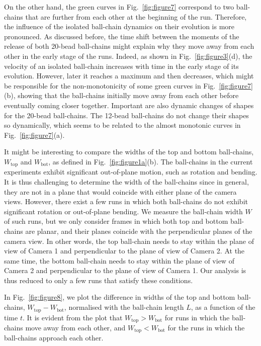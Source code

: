 \documentclass{article}
\begin{document}
On the other hand, the green curves in Fig.~\ref{fig:figure7} correspond to two ball-chains that are further from each other at the beginning of the run. Therefore, the influence of the %
isolated ball-chain dynamics on their evolution is more pronounced. As discussed before, the time shift between the moments of the release of both 20-bead ball-chains might explain why they move away from each other in the early stage of the runs. Indeed, as shown in Fig.~\ref{fig:figure3}(d), the velocity of an isolated ball-chain increases with time in the early stage of its evolution. However, later it reaches a maximum and then decreases, which might be responsible for the non-monotonicity of some green curves in 
Fig.~\ref{fig:figure7}(b), showing that the ball-chains initially move away from each other before eventually coming closer together. Important are also
dynamic changes of shapes for the 20-bead ball-chains. %
The 12-bead ball-chains do not change their shapes so dynamically, %
which seems to be related to the almost monotonic curves in Fig.~\ref{fig:figure7}(a). 

It might be interesting to compare the widths of the top and bottom ball-chains, $W_{\text{top}}$ and $W_\text{{bot}}$, as defined in Fig.~\ref{fig:figure1a}(b). 
The ball-chains in the current experiments exhibit significant out-of-plane motion, such as rotation and bending. It is thus challenging to determine %
the width of the ball-chains %
since in general, they are %
not in a plane that would coincide with %
either plane of the camera views. However, there exist a few runs in which both ball-chains do not exhibit significant rotation or out-of-plane bending. We measure the ball-chain width $W$ of such runs, %
but we only consider frames in which both top and bottom ball-chains are planar, and their planes coincide with the perpendicular planes of the camera view.  %
In other words, the top ball-chain  needs  to stay within the plane of view of %
Camera 1 and perpendicular to the plane of view of Camera 2. At the same time, the bottom ball-chain needs  to stay within the plane of view of %
Camera 2 and perpendicular to the plane of view of Camera 1. %
Our %
analysis is thus reduced to only a few runs that satisfy these conditions. 

In Fig.~\ref{fig:figure8}, we %
plot the difference in widths of the top and bottom ball-chains, $W_\text{{top}} - W_\text{{bot}}$, %
normalised with the ball-chain length $L$, as a function of the time $t$. %
It is evident from the plot that $W_\text{{top}} > W_\text{{bot}}$
for runs in which the ball-chains move away from each other, %
and  $W_\text{{top}} < W_\text{{bot}}$
for the runs in which the ball-chains approach each other. %
\end{document}
